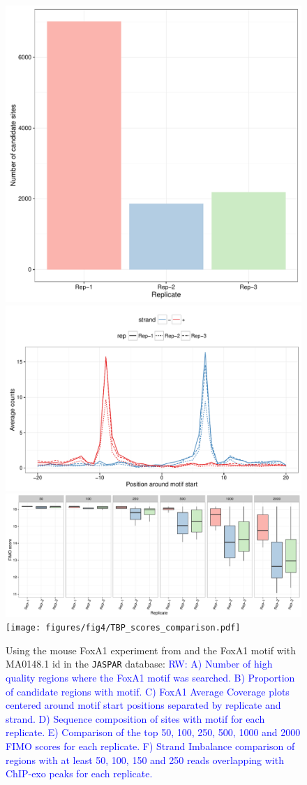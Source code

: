\documentclass{bmcart}
\newcommand{\RW}[1]{\textcolor{blue}{RW: #1}}
\begin{document}
\begin{figure}[h!]
  \centering  
  \includegraphics[width = .23 \textwidth, page = 3]{figures/fig4/FoxA1_barplots.pdf}
  \includegraphics[width =.4\textwidth]{figures/fig4/FoxA1_profiles_around_motif.pdf}
  \includegraphics[width = .8\textwidth,page = 1]{figures/fig4/FoxA1_fimo_score.pdf}
  \texttt{[image: figures/fig4/TBP\_scores\_comparison.pdf]}
  \caption{Using the mouse FoxA1 experiment from \cite{exoillumina}
    and the FoxA1 motif with MA0148.1 id in the \texttt{JASPAR}
    database: \RW{ A) Number of high quality regions where the FoxA1
      motif was searched. B) Proportion of candidate regions with
      motif. C) FoxA1 Average Coverage plots centered around motif
      start positions separated by replicate and strand. D) Sequence
      composition of sites with motif for each replicate. E)
      Comparison of the top 50, 100, 250, 500, 1000 and 2000 FIMO
      scores for each replicate. F) Strand Imbalance comparison of
      regions with at least 50, 100, 150 and 250 reads overlapping
      with ChIP-exo peaks for each replicate.}}
  \label{fig:4}
\end{figure}
\end{document}
